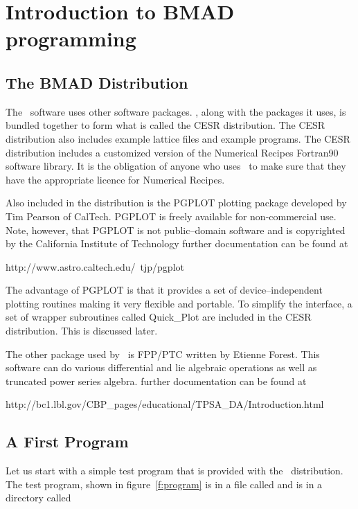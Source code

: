 \chapter{Introduction to BMAD programming}

\section{The BMAD Distribution}

The \bmad\ software uses other software packages. \bmad, along with
the packages it uses, is bundled together to form what is called the
CESR distribution. The CESR distribution also includes example lattice
files and example programs. The CESR distribution includes a
customized version of the Numerical Recipes Fortran90 software
library\cite{b:nr}. It is the obligation of anyone who uses \bmad\ to
make sure that they have the appropriate licence for Numerical
Recipes.

Also included in the distribution is the PGPLOT plotting package
developed by Tim Pearson of CalTech.  PGPLOT is freely available for
non-commercial use. Note, however, that PGPLOT is not public--domain
software and is copyrighted by the California Institute of Technology
further documentation can be found at
\begin{example}
    http://www.astro.caltech.edu/~tjp/pgplot
\end{example}
The advantage of PGPLOT is that it provides a set of
device--independent plotting routines making it very flexible and
portable. To simplify the interface, a set of wrapper subroutines
called Quick\_Plot are included in the CESR distribution. This is
discussed later.

The other package used by \bmad\ is FPP/PTC written by Etienne
Forest. This software can do various differential and lie algebraic
operations as well as truncated power series algebra. further
documentation can be found at
\begin{example}
    http://bc1.lbl.gov/CBP_pages/educational/TPSA_DA/Introduction.html
\end{example}

\section{A First Program}

Let us start with a simple test program that is provided with the
\bmad\ distribution. The test program, shown in figure~\ref{f:program}
is in a file called
 and is in a directory called 


